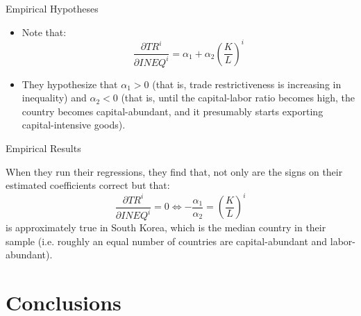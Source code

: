 \documentclass[aspectratio=169]{beamer}
\begin{document}
\begin{frame}{Empirical Hypotheses}

\begin{itemize}
    \item<1-> Note that:
    \begin{equation*}
        \frac{\partial TR^{i}}{\partial INEQ^{i}} = \alpha_{1} + \alpha_{2} \left( \frac{K}{L} \right)^{i}
    \end{equation*}
    \item<2-> They hypothesize that $ \alpha_{1} > 0 $ (that is, trade restrictiveness is increasing in inequality) and $ \alpha_{2} < 0 $ (that is, until the capital-labor ratio becomes high, the country becomes capital-abundant, and it presumably starts exporting capital-intensive goods).
\end{itemize}
    
\end{frame}


\begin{frame}{Empirical Results}

When they run their regressions, they find that, not only are the signs on their estimated coefficients correct but that:
\begin{equation*}
    \frac{\partial TR^{i}}{\partial INEQ^{i}} = 0 \Leftrightarrow -\frac{\alpha_{1}}{\alpha_{2}} = \left( \frac{K}{L} \right)^{i}
\end{equation*}
is approximately true in South Korea, which is the median country in their sample (i.e. roughly an equal number of countries are capital-abundant and labor-abundant).
    
\end{frame}


\section{Conclusions}

\end{document}
